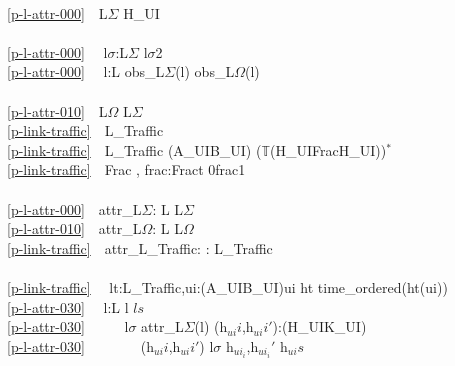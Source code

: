{%
\bp
{}\\
\ref{p-l-attr-000}\ \ L$\Sigma$ {\EQ} H\_UI\\
\\
\ref{p-l-attr-000}\ \ {\ALL} l$\sigma$:L$\Sigma${\RDOT} l$\sigma${\EQ}2\\
\ref{p-l-attr-000}\ \ {\ALL} l:L {\RDOT} obs\_L$\Sigma$(l) {\ISIN} obs\_L$\Omega$(l)\\
\\
\ref{p-l-attr-010}\ \ L$\Omega$ {\EQ} L$\Sigma$\\
\ref{p-link-traffic}\ \ L\_Traffic\\
\ref{p-link-traffic}\ \ L\_Traffic {\EQ} (A\_UI{\BAR}B\_UI) {\MARROW} ($\mathbb{T}${\TIMES}(H\_UI{\TIMES}Frac{\TIMES}H\_UI))$^{\ast}$\ \ \ \ \ \ \\
\ref{p-link-traffic}\ \ Frac {\EQ} ,  frac:Fract {\RDOT} 0{\LT}frac{\LT}1\\
 \\
\ref{p-l-attr-000}\ \ attr\_L$\Sigma$: L {\RIGHTARROW} L$\Sigma$\\
\ref{p-l-attr-010}\ \ attr\_L$\Omega$: L {\RIGHTARROW} L$\Omega$\\
\ref{p-link-traffic}\ \ attr\_L\_Traffic: : {\RIGHTARROW} L\_Traffic\\
\\
\ref{p-link-traffic}\ \ {\ALL} lt:L\_Traffic,ui:(A\_UI{\BAR}B\_UI){\RDOT}ui {\ISIN}  ht {\DBLRIGHTARROW} time\_ordered(ht(ui))\\
\ref{p-l-attr-030}\ \ {\ALL} l:L {\RDOT} l {\ISIN} $ls$ {\DBLRIGHTARROW} \\
\ref{p-l-attr-030}\ \ \ \ \  l$\sigma$ {\EQ} attr\_L$\Sigma$(l)  {\ALL} (h$_{ui}i$,h$_{ui}i'$):(H\_UI{\TIMES}K\_UI) {\RDOT} \\
\ref{p-l-attr-030}\ \ \ \ \ \ \ \ (h$_{ui}i$,h$_{ui}i'$) {\ISIN} l$\sigma$ {\DBLRIGHTARROW} {\LBRACE}h$_{ui_i}$,h$_{ui_i}'${\RBRACE} {\SUBSETEQ} h$_{ui}s$ \ \ 
\ep
\pos{\emcii}{}

}
